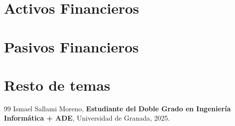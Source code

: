 \documentclass[a4paper,12pt]{book}
\begin{document}
\tableofcontents
\newpage

\chapter{Activos Financieros}



\chapter{Pasivos Financieros}



\chapter{Resto de temas}





\newpage
\begin{thebibliography}{99}
    Ismael Sallami Moreno, \textbf{Estudiante del Doble Grado en Ingeniería Informática + ADE}, Universidad de Granada, 2025.
    
    \end{thebibliography}
\end{document}
